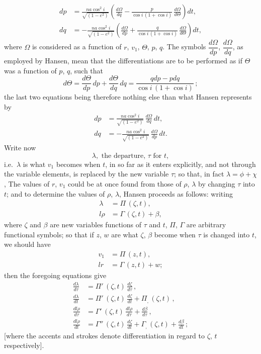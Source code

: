 \documentclass[11pt]{article}
\begin{document}
\[
\begin{aligned}
dp &= \frac{na\cos^{2}i}{\sqrt{(1-e^{2})}}\!\left(\frac{d\Omega}{dq} - \frac{p}{\cos i\,(1 + \cos i)}\,\frac{d\Omega}{d\Theta}\right)dt,\\
dq &= -\frac{na\cos^{2}i}{\sqrt{(1-e^{2})}}\!\left(\frac{d\Omega}{dp} + \frac{q}{\cos i\,(1 + \cos i)}\,\frac{d\Omega}{d\Theta}\right)dt,
\end{aligned}
\]
where $\Omega$ is considered as a function of $r$, $v_{1}$, $\Theta$, $p$, $q$. The symbols $\dfrac{d\Omega}{dp}$, $\dfrac{d\Omega}{dq}$, as
employed by Hansen, mean that the differentiations are to be performed as if $\Theta$ was
a function of $p$, $q$, such that
\[
d\Theta = \frac{d\Theta}{dp}\,dp + \frac{d\Theta}{dq}\,dq = \frac{qdp - pdq}{\cos i\,(1 + \cos i)}\,;
\]
the last two equations being therefore nothing else than what Hansen represents by
\begin{align*}
dp &= \frac{na\cos^{2}i}{\sqrt{(1-e^{2})}}\,\frac{d\Omega}{dq}\,dt,\\
dq &= -\frac{na\cos^{2}i}{\sqrt{(1-e^{2})}}\,\frac{d\Omega}{dp}\,dt.
\end{align*}
Write now
\[
\lambda, \text{ the departure, } \tau \text{ for } t,
\]
i.e.\ $\lambda$ is what $v_{1}$ becomes when $t$, in so far as it enters explicitly, and not through
the variable elements, is replaced by the new variable $\tau$; so that, in fact $\lambda = \phi + \chi$,
The values of $r$, $v_{1}$ could be at once found from those of $\rho$, $\lambda$ by changing $\tau$ into $t$;
and to determine the values of $\rho$, $\lambda$, Hansen proceeds as follows: writing
\begin{align*}
\lambda &= \Pi\,(\zeta, t),\\
l\rho &= \Gamma\,(\zeta, t) + \beta,
\end{align*}
where $\zeta$ and $\beta$ are new variables functions of $\tau$ and $t$, $\Pi$, $\Gamma$ are arbitrary
functional symbols; so that if $z$, $w$ are what $\zeta$, $\beta$ become when $\tau$ is changed into $t$,
we should have
\begin{align*}
v_{1} &= \Pi\,(z, t),\\
lr &= \Gamma\,(z, t) + w;
\end{align*}
then the foregoing equations give
\begin{align*}
\frac{d\lambda}{d\tau} &= \Pi'\,(\zeta, t)\,\frac{d\zeta}{d\tau}\,,\\
\frac{d\lambda}{dt} &= \Pi'\,(\zeta, t)\,\frac{d\zeta}{dt} + \Pi_{,}\,(\zeta, t)\,,\\
\frac{dl\rho}{d\tau} &= \Gamma'\,(\zeta, t)\,\frac{dl\rho}{d\tau} + \frac{d\beta}{d\tau}\,,\\
\frac{dl\rho}{dt} &= \Gamma''\,(\zeta, t)\,\frac{d\zeta}{dt} + \Gamma_{,}\,(\zeta, t) + \frac{d\beta}{dt}\,;
\end{align*}
[where the accents and strokes denote differentiation in regard to $\zeta$, $t$ respectively].
\end{document}
